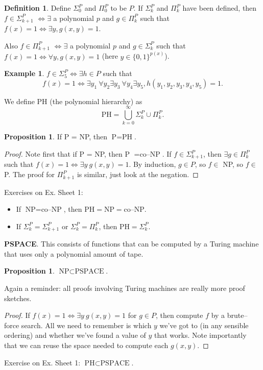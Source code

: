 \documentclass{article}
\theoremstyle{definition}
\newtheorem{prop}[theorem]{Proposition}
\newtheorem{example}{Example}[section]
\newtheorem{defn}{Definition}[section]
\begin{document}
\begin{defn}
    Define $\Sigma_{0}^P$ and $\Pi_0^P$ to be $P$. If $\Sigma_{k}^P$ and $\Pi_k^P$ have been defined, then $f \in \Sigma_{k+1}^P$ $\iff \exists $ a polynomial $p$ and $g \in \Pi_k^P$ such that $f(x)=1 \iff \exists y, g(x,y) = 1$. 
    \vspace{1mm}
     
    Also $f \in \Pi_{k+1}^P$ $\iff \exists $ a polynomial $p$ and $g \in \Sigma_k^P$  such that $f(x)=1 \iff \forall  y, g(x,y) = 1$ (here $y \in \{0,1\}^{p(x)}$).
\end{defn}
\begin{example}
    $f \in \Sigma_{5}^P \iff \exists h \in P$ such that $$f(x)=1 \iff \exists y_1 ~\forall y_2 \exists y_3 ~\forall y_4 \exists y_5, h(y_1,y_2,y_3,y_4,y_5)=1.$$
\end{example}
We define PH (the polynomial hierarchy) as \[
\text{PH} = \bigcup_{k=0}^{\infty} \Sigma_k^P \cup \Pi_k^P.
\]
\begin{prop}
    If P = NP, then $\text{P} = \text{PH}$.
\end{prop}
\begin{proof}
    Note first that if P = NP, then P $= \text{co--NP}$. If $f \in \Sigma_{k+1}^P$, then $\exists g \in \Pi_k^P$ such that $f(x)=1 \iff \exists y~ g(x,y)=1$. By induction, $g \in P$, so $f \in $ NP, so $f \in $ P. The proof for $\Pi_{k+1}^P$ is similar, just look at the negation.
\end{proof}
Exercises on Ex. Sheet 1: 
\begin{itemize}
    \item If $\text{NP} = \text{co--NP}$, then $\text{PH} = \text{NP} = \text{co--NP}$.
    \item If $\Sigma_k^P = \Sigma_{k+1}^P$ or $\Sigma_k^P = \Pi_k^P$, then $\text{PH} = \Sigma_k^P$.
\end{itemize}

\vspace{1mm}
 
\textbf{PSPACE}. This consists of functions that can be computed by a Turing machine that uses only a polynomial amount of tape.
\begin{prop}
    $\text{NP} \subset \text{PSPACE}$.
\end{prop}
Again a reminder: all proofs involving Turing machines are really more proof sketches.
\begin{proof}
    If $f(x)=1 \iff \exists y~g(x,y)=1$ for $g \in P$, then compute $f$ by a brute--force search. All we need to remember is which $y$ we've got to (in any sensible ordering) and whether we've found a value of $y$ that works. Note importantly that we can reuse the space needed to compute each $g(x,y)$.
\end{proof}
Exercise on Ex. Sheet 1: $\text{PH} \subset \text{PSPACE}$.
\vspace{1mm}
 
\end{document}
